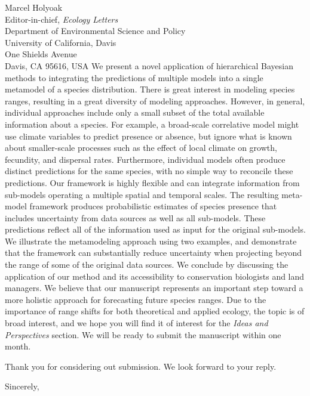 \documentclass[11pt]{letter}
\makeatletter
\renewcommand{\closing}[1]{\par\nobreak\vspace{\parskip}%
  \stopbreaks
  \noindent
  \ifx\@empty\fromaddress\else
  \hspace*{\longindentation}\fi
  \parbox{\indentedwidth}{\raggedright
       \ignorespaces #1\\[1\medskipamount]%
       \ifx\@empty\fromsig
           \fromname
       \else \fromsig \fi\strut}%
   \par}
\makeatother
\begin{document}
\begin{letter}{Marcel Holyoak \\ 
	Editor-in-chief, \emph{Ecology Letters} \\ 
	Department of Environmental Science and Policy \\
	University of California, Davis \\
	One Shields Avenue \\
	Davis, CA 95616, USA }
We present a novel application of hierarchical Bayesian methods to integrating the predictions of multiple models into a single metamodel of a species distribution.
There is great interest in modeling species ranges, resulting in a great diversity of modeling approaches.
However, in general, individual approaches include only a small subset of the total available information about a species. 
For example, a broad-scale correlative model might use climate variables to predict presence or absence, but ignore what is known about smaller-scale processes such as the effect of local climate on growth, fecundity, and dispersal rates.
Furthermore, individual models often produce distinct predictions for the same species, with no simple way to reconcile these predictions.
Our framework is highly flexible and can integrate information from sub-models operating a multiple spatial and temporal scales.
The resulting meta-model framework produces probabilistic estimates of species presence that includes uncertainty from data sources as well as all sub-models.
 These predictions reflect all of the information used as input for the original sub-models.
We illustrate the metamodeling approach using two examples, and demonstrate that the framework can substantially reduce uncertainty when projecting beyond the range of some of the original data sources.
We conclude by discussing the application of our method and its accessibility to conservation biologists and land managers.
We believe that our manuscript represents an important step toward a more holistic approach for forecasting future species ranges.
Due to the importance of range shifts for both theoretical and applied ecology, the topic is of broad interest, and we hope you will find it of interest for the \emph{Ideas and Perspectives} section.
We will be ready to submit the manuscript within one month.

Thank you for considering out submission. We look forward to your reply.

\closing{Sincerely,}

\end{letter}
\end{document}

